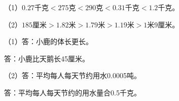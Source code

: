 
\begingroup\color{answerred}\par\endgroup
{}
\begingroup\color{answerred}\noindent（1）$0.27$千克$<275$克$<290$克$<0.31$千克$<1.2$千克。\par
\noindent（2）$185$厘米$>1.82$米$>1.79$米$>1.19$米$>1$米$9$厘米。\par\par\endgroup
{}
\begingroup\color{answerred}\noindent（1）答：小鹿的体长更长。\par\hspace*{2em}答：小鹿比天鹅长45厘米。\par
\noindent（2）答：平均每人每天节约用水0.0005吨。\par\hspace*{2em}答：平均每人每天节约的用水量合0.5千克。\par\par\endgroup
